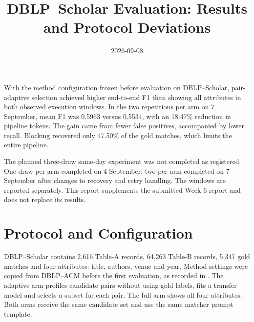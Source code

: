 \documentclass[11pt]{article}
\title{DBLP--Scholar Evaluation: Results and Protocol Deviations}
\author{}
\date{2026-09-08}
\begin{document}
\maketitle

With the method configuration frozen before evaluation on DBLP--Scholar,
pair-adaptive selection achieved higher end-to-end F1 than showing all attributes
in both observed execution windows. In the two repetitions per arm on 7 September,
mean F1 was 0.5963 versus 0.5534, with an 18.47\% reduction in pipeline tokens.
The gain came from fewer false positives, accompanied by lower recall.
Blocking recovered only 47.50\% of the gold matches, which limits the entire pipeline.

The planned three-draw same-day experiment was not completed as registered.
One draw per arm completed on 4 September; two per arm completed on 7 September
after changes to recovery and retry handling. The windows are reported separately.
This report supplements the submitted Week 6 report and does not replace its results.

\section{Protocol and Configuration}
DBLP--Scholar contains 2,616 Table-A records, 64,263 Table-B records, 5,347
gold matches and four attributes: title, authors, venue and year. Method settings
were copied from DBLP--ACM before the first evaluation, as recorded in
. The adaptive arm profiles
candidate pairs without using gold labels, fits a transfer model and selects a
subset for each pair. The full arm shows all four attributes. Both arms receive
the same candidate set and use the same matcher prompt template.
\end{document}
